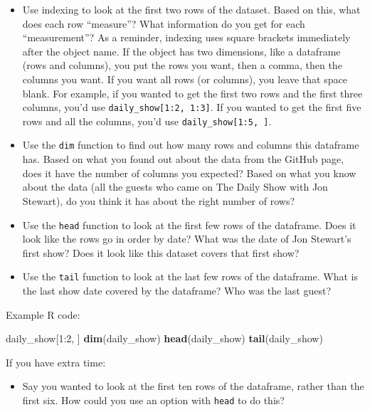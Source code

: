 \documentclass[]{book}
\makeatletter
\newenvironment{Shaded}{\begin{snugshade}}{\end{snugshade}}
\newcommand{\KeywordTok}[1]{\textcolor[rgb]{0.13,0.29,0.53}{\textbf{{#1}}}}
\newcommand{\DecValTok}[1]{\textcolor[rgb]{0.00,0.00,0.81}{{#1}}}
\newcommand{\NormalTok}[1]{{#1}}
\providecommand{\tightlist}{%
  \setlength{\itemsep}{0pt}\setlength{\parskip}{0pt}}
\newenvironment{kframe}{%
\medskip{}
\setlength{\fboxsep}{.8em}
 \def\at@end@of@kframe{}%
 \ifinner\ifhmode%
  \def\at@end@of@kframe{\end{minipage}}%
  \begin{minipage}{\columnwidth}%
 \fi\fi%
 \def\FrameCommand##1{\hskip\@totalleftmargin \hskip-\fboxsep
 \colorbox{shadecolor}{##1}\hskip-\fboxsep
     \hskip-\linewidth \hskip-\@totalleftmargin \hskip\columnwidth}%
 \MakeFramed {\advance\hsize-\width
   \@totalleftmargin\z@ \linewidth\hsize
   \@setminipage}}%
 {\par\unskip\endMakeFramed%
 \at@end@of@kframe}
\renewenvironment{Shaded}{\begin{kframe}}{\end{kframe}}
\makeatother
\begin{document}
\begin{itemize}
\tightlist
\item
  Use indexing to look at the first two rows of the dataset. Based on
  this, what does each row ``measure''? What information do you get for
  each ``measurement''? As a reminder, indexing uses square brackets
  immediately after the object name. If the object has two dimensions,
  like a dataframe (rows and columns), you put the rows you want, then a
  comma, then the columns you want. If you want all rows (or columns),
  you leave that space blank. For example, if you wanted to get the
  first two rows and the first three columns, you'd use
  \texttt{daily\_show{[}1:2,\ 1:3{]}}. If you wanted to get the first
  five rows and all the columns, you'd use
  \texttt{daily\_show{[}1:5,\ {]}}.
\item
  Use the \texttt{dim} function to find out how many rows and columns
  this dataframe has. Based on what you found out about the data from
  the GitHub page, does it have the number of columns you expected?
  Based on what you know about the data (all the guests who came on The
  Daily Show with Jon Stewart), do you think it has about the right
  number of rows?
\item
  Use the \texttt{head} function to look at the first few rows of the
  dataframe. Does it look like the rows go in order by date? What was
  the date of Jon Stewart's first show? Does it look like this dataset
  covers that first show?
\item
  Use the \texttt{tail} function to look at the last few rows of the
  dataframe. What is the last show date covered by the dataframe? Who
  was the last guest?
\end{itemize}

Example R code:

\begin{Shaded}
\begin{Highlighting}[]
\NormalTok{daily_show[}\DecValTok{1}\NormalTok{:}\DecValTok{2}\NormalTok{, ]}
\KeywordTok{dim}\NormalTok{(daily_show)}
\KeywordTok{head}\NormalTok{(daily_show)}
\KeywordTok{tail}\NormalTok{(daily_show)}
\end{Highlighting}
\end{Shaded}

If you have extra time:

\begin{itemize}
\tightlist
\item
  Say you wanted to look at the first ten rows of the dataframe, rather
  than the first six. How could you use an option with \texttt{head} to
  do this?
\end{itemize}
\end{document}
